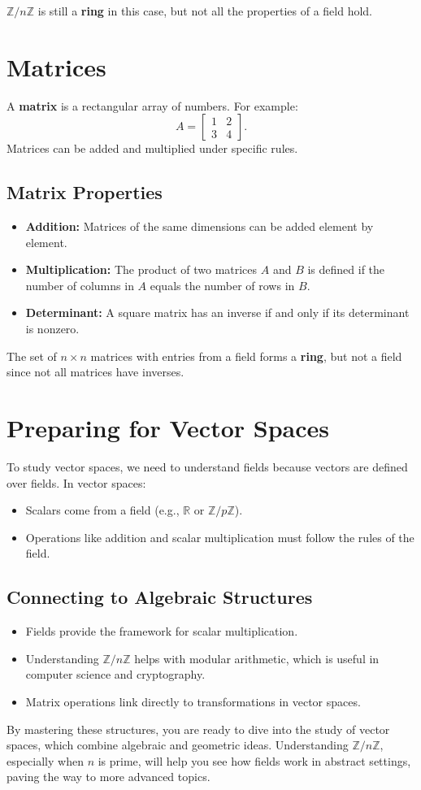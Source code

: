 \documentclass[12pt]{article}
\begin{document}
$\mathbb{Z}/n\mathbb{Z}$ is still a \textbf{ring} in this case, but not all the properties of a field hold.

\section{Matrices}
A \textbf{matrix} is a rectangular array of numbers. For example:
\[ A = \begin{bmatrix} 1 & 2 \\ 3 & 4 \end{bmatrix}. \]
Matrices can be added and multiplied under specific rules. 

\subsection{Matrix Properties}
\begin{itemize}
    \item \textbf{Addition:} Matrices of the same dimensions can be added element by element.
    \item \textbf{Multiplication:} The product of two matrices $A$ and $B$ is defined if the number of columns in $A$ equals the number of rows in $B$.
    \item \textbf{Determinant:} A square matrix has an inverse if and only if its determinant is nonzero.
\end{itemize}
The set of $n \times n$ matrices with entries from a field forms a \textbf{ring}, but not a field since not all matrices have inverses.

\section{Preparing for Vector Spaces}
To study vector spaces, we need to understand fields because vectors are defined over fields. In vector spaces:
\begin{itemize}
    \item Scalars come from a field (e.g., $\mathbb{R}$ or $\mathbb{Z}/p\mathbb{Z}$).
    \item Operations like addition and scalar multiplication must follow the rules of the field.
\end{itemize}

\subsection{Connecting to Algebraic Structures}
\begin{itemize}
    \item Fields provide the framework for scalar multiplication.
    \item Understanding $\mathbb{Z}/n\mathbb{Z}$ helps with modular arithmetic, which is useful in computer science and cryptography.
    \item Matrix operations link directly to transformations in vector spaces.
\end{itemize}

By mastering these structures, you are ready to dive into the study of vector spaces, which combine algebraic and geometric ideas. Understanding $\mathbb{Z}/n\mathbb{Z}$, especially when $n$ is prime, will help you see how fields work in abstract settings, paving the way to more advanced topics.
\end{document}

